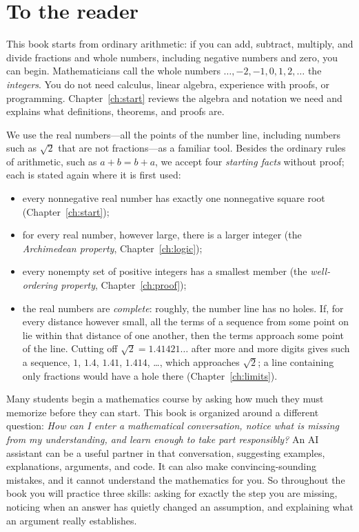 \chapter*{To the reader}
This book starts from ordinary arithmetic: if you can add, subtract, multiply, and divide fractions and whole numbers, including negative numbers and zero, you can begin. Mathematicians call the whole numbers $\ldots,-2,-1,0,1,2,\ldots$ the \emph{integers}. You do not need calculus, linear algebra, experience with proofs, or programming. Chapter~\ref{ch:start} reviews the algebra and notation we need and explains what definitions, theorems, and proofs are.

We use the real numbers---all the points of the number line, including numbers such as $\sqrt2$ that are not fractions---as a familiar tool. Besides the ordinary rules of arithmetic, such as $a+b=b+a$, we accept four \emph{starting facts} without proof; each is stated again where it is first used:
\begin{itemize}
\item every nonnegative real number has exactly one nonnegative square root (Chapter~\ref{ch:start});
\item for every real number, however large, there is a larger integer (the \emph{Archimedean property}, Chapter~\ref{ch:logic});
\item every nonempty set of positive integers has a smallest member (the \emph{well-ordering property}, Chapter~\ref{ch:proof});
\item the real numbers are \emph{complete}: roughly, the number line has no holes. If, for every distance however small, all the terms of a sequence from some point on lie within that distance of one another, then the terms approach some point of the line. Cutting off $\sqrt2=1.41421\ldots$ after more and more digits gives such a sequence, $1$, $1.4$, $1.41$, $1.414$, \ldots, which approaches $\sqrt2$; a line containing only fractions would have a hole there (Chapter~\ref{ch:limits}).
\end{itemize}

Many students begin a mathematics course by asking how much they must memorize before they can start. This book is organized around a different question: \emph{How can I enter a mathematical conversation, notice what is missing from my understanding, and learn enough to take part responsibly?} An AI assistant can be a useful partner in that conversation, suggesting examples, explanations, arguments, and code. It can also make convincing-sounding mistakes, and it cannot understand the mathematics for you. So throughout the book you will practice three skills: asking for exactly the step you are missing, noticing when an answer has quietly changed an assumption, and explaining what an argument really establishes.

